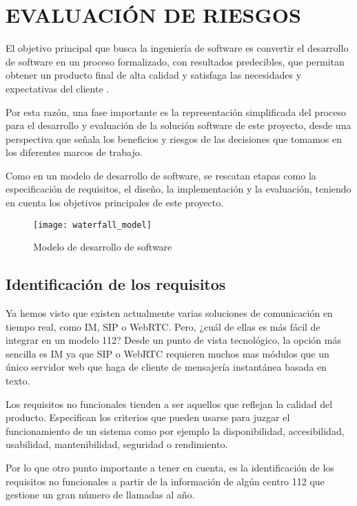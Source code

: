 \chapter{EVALUACIÓN DE RIESGOS\label{sec:disenho}}

\clearpage

El objetivo principal que busca la ingeniería de software es convertir el desarrollo de software en un proceso formalizado, con resultados predecibles, que permitan obtener un producto final de alta calidad y satisfaga las necesidades y expectativas del cliente \cite{modelo1}.

Por esta razón, una fase importante es la representación simplificada del proceso para el desarrollo y evaluación de la solución software de este proyecto, desde una perspectiva que señala los beneficios y riesgos de las decisiones que tomamos en los diferentes marcos de trabajo.

Como en un modelo de desarrollo de software, se rescatan etapas como la especificación de requisitos, el diseño, la implementación y la evaluación, teniendo en cuenta los objetivos principales de este proyecto.

\begin{figure}[htp!]
  \centering
  \texttt{[image: waterfall\_model]}
  \caption{Modelo de desarrollo de software}
  \label{fig:waterfall_model}
\end{figure}

\section{Identificación de los requisitos}

Ya hemos visto que existen actualmente varias soluciones de comunicación en tiempo real, como IM, SIP o WebRTC. Pero, ¿cuál de ellas es más fácil de integrar en un modelo 112? Desde un punto de vista tecnológico, la opción más sencilla es IM ya que SIP o WebRTC requieren muchos mas módulos que un único servidor web que haga de cliente de mensajería instantánea basada en texto.

Los requisitos no funcionales tienden a ser aquellos que reflejan la calidad del producto. Especifican los criterios que pueden usarse para juzgar el funcionamiento de un sistema como por ejemplo la disponibilidad, accesibilidad, usabilidad, mantenibilidad, seguridad o rendimiento.

Por lo que otro punto importante a tener en cuenta, es la identificación de los requisitos no funcionales a partir de la información de algún centro 112 que gestione un gran número de llamadas al año.

